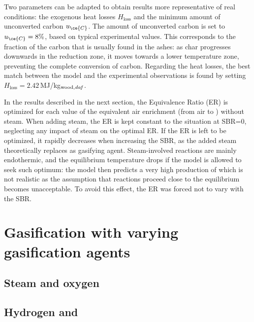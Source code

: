 Two parameters can be adapted to obtain results more representative of real conditions: the exogenous heat losses $H_\text{loss}$ and the minimum amount of unconverted carbon $u_{\ce{C}}$. The amount of unconverted carbon is set to $u_{\ce{C}}=8\%$, based on typical experimental values. This corresponds to the fraction of the carbon that is usually found in the ashes: as char progresses downwards in the reduction zone, it moves towards a lower temperature zone, preventing the complete conversion of carbon. Regarding the heat losses, the best match between the model and the experimental observations is found by setting $H_\text{loss}=2.42$\,MJ/kg$_\text{wood,\textit{daf}}$.



In the results described in the next section, the Equivalence Ratio (ER) is optimized for each value of the equivalent air enrichment (from air to ) without steam. When adding steam, the ER is kept constant to the situation at SBR=0, neglecting any impact of steam on the optimal ER. If the ER is left to be optimized, it rapidly decreases when increasing the SBR, as the added steam theoretically replaces  as gasifying agent. Steam-involved reactions are mainly endothermic, and the equilibrium temperature drops if the model is allowed to seek such optimum: the model then predicts a very high production of  which is not realistic as the assumption that reactions proceed close to the equilibrium becomes unacceptable. To avoid this effect, the ER was forced not to vary with the SBR.


\section{Gasification with varying gasification agents}

\subsection{Steam and oxygen}


\subsection{Hydrogen and }








